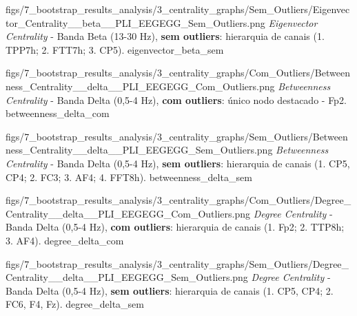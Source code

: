 \ultrawidefigure
  {figs/7_bootstrap_results_analysis/3_centrality_graphs/Sem_Outliers/Eigenvector_Centrality__beta__PLI_EEGEGG_Sem_Outliers.png}
  {\textit{Eigenvector Centrality} - Banda Beta (13-30 Hz), \textbf{sem outliers}: hierarquia de canais (1. TPP7h; 2. FTT7h; 3. CP5).}
  {eigenvector_beta_sem}


\ultrawidefigure
  {figs/7_bootstrap_results_analysis/3_centrality_graphs/Com_Outliers/Betweenness_Centrality__delta__PLI_EEGEGG_Com_Outliers.png}
  {\textit{Betweenness Centrality} - Banda Delta (0{,}5-4 Hz), \textbf{com outliers}: único nodo destacado - Fp2.}
  {betweenness_delta_com}

\ultrawidefigure
  {figs/7_bootstrap_results_analysis/3_centrality_graphs/Sem_Outliers/Betweenness_Centrality__delta__PLI_EEGEGG_Sem_Outliers.png}
  {\textit{Betweenness Centrality} - Banda Delta (0{,}5-4 Hz), \textbf{sem outliers}: hierarquia de canais (1. CP5, CP4; 2. FC3; 3. AF4; 4. FFT8h).}
  {betweenness_delta_sem}


\ultrawidefigure
  {figs/7_bootstrap_results_analysis/3_centrality_graphs/Com_Outliers/Degree_Centrality__delta__PLI_EEGEGG_Com_Outliers.png}
  {\textit{Degree Centrality} - Banda Delta (0{,}5-4 Hz), \textbf{com outliers}: hierarquia de canais (1. Fp2; 2. TTP8h; 3. AF4).}
  {degree_delta_com}

\ultrawidefigure
  {figs/7_bootstrap_results_analysis/3_centrality_graphs/Sem_Outliers/Degree_Centrality__delta__PLI_EEGEGG_Sem_Outliers.png}
  {\textit{Degree Centrality} - Banda Delta (0{,}5-4 Hz), \textbf{sem outliers}: hierarquia de canais (1. CP5, CP4; 2. FC6, F4, Fz).}
  {degree_delta_sem}


